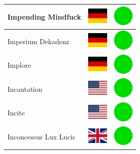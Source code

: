 \documentclass[12pt, a4paper, twoside]{report}
\begin{document}
\begin{center}
\begin{longtable}{|p{5cm}|p{2cm}|p{2cm}|}
 Impending Mindfuck                                         & \includegraphics[width=1cm]{4x3/de} &   \includegraphics[width=1cm]{likes/y} \\ \hline
 Imperium Dekadenz                                          & \includegraphics[width=1cm]{4x3/de} &   \includegraphics[width=1cm]{likes/y} \\ \hline
 Implore                                                    & \includegraphics[width=1cm]{4x3/de} &   \includegraphics[width=1cm]{likes/y} \\ \hline
 Incantation                                                & \includegraphics[width=1cm]{4x3/us} &   \includegraphics[width=1cm]{likes/y} \\ \hline
 Incite                                                     & \includegraphics[width=1cm]{4x3/us} &   \includegraphics[width=1cm]{likes/y} \\ \hline
 Inconcessus Lux Lucis                                      & \includegraphics[width=1cm]{4x3/gb} &   \includegraphics[width=1cm]{likes/y} \\ \hline

\end{longtable}
\end{center}
\end{document}
